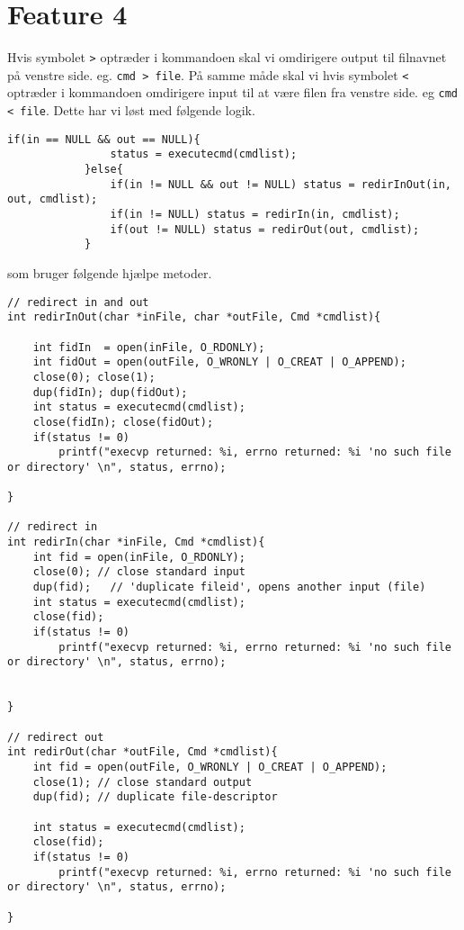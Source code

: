 \documentclass[danish]{report}
\begin{document}
\section{Feature 4}

Hvis symbolet {\tt >} optræder i kommandoen skal vi omdirigere output til filnavnet på venstre side. eg. {\tt cmd > file}. På samme måde skal vi hvis symbolet {\tt <} optræder i kommandoen omdirigere input til at være filen fra venstre side. eg {\tt cmd < file}. Dette har vi løst med følgende logik.

\begin{lstlisting}
if(in == NULL && out == NULL){
                status = executecmd(cmdlist);
            }else{
                if(in != NULL && out != NULL) status = redirInOut(in, out, cmdlist);
                if(in != NULL) status = redirIn(in, cmdlist);
                if(out != NULL) status = redirOut(out, cmdlist);
            }
\end{lstlisting}

som bruger følgende hjælpe metoder.

\begin{lstlisting}
// redirect in and out
int redirInOut(char *inFile, char *outFile, Cmd *cmdlist){
    
    int fidIn  = open(inFile, O_RDONLY);
    int fidOut = open(outFile, O_WRONLY | O_CREAT | O_APPEND);              
    close(0); close(1);
    dup(fidIn); dup(fidOut);
    int status = executecmd(cmdlist);
    close(fidIn); close(fidOut);
    if(status != 0) 
        printf("execvp returned: %i, errno returned: %i 'no such file or directory' \n", status, errno);

}

// redirect in
int redirIn(char *inFile, Cmd *cmdlist){
    int fid = open(inFile, O_RDONLY);  
    close(0); // close standard input
    dup(fid);   // 'duplicate fileid', opens another input (file)    
    int status = executecmd(cmdlist);
    close(fid);             
    if(status != 0) 
        printf("execvp returned: %i, errno returned: %i 'no such file or directory' \n", status, errno);


}

// redirect out
int redirOut(char *outFile, Cmd *cmdlist){
    int fid = open(outFile, O_WRONLY | O_CREAT | O_APPEND);         
    close(1); // close standard output
    dup(fid); // duplicate file-descriptor

    int status = executecmd(cmdlist);
    close(fid);             
    if(status != 0) 
        printf("execvp returned: %i, errno returned: %i 'no such file or directory' \n", status, errno);

}
\end{lstlisting}
\end{document}
